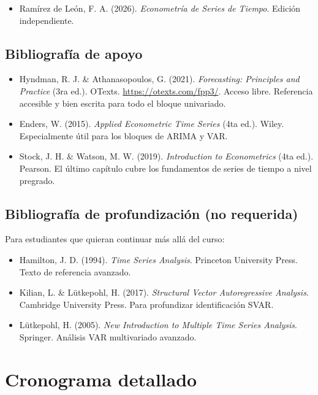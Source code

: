 \documentclass[11pt,letterpaper]{article}
\begin{document}
\begin{itemize}[leftmargin=*, itemsep=0.15em]
  \item Ramírez de León, F. A. (2026). \emph{Econometría de Series de Tiempo}. Edición independiente. 
\end{itemize}

\subsection{Bibliografía de apoyo}

\begin{itemize}[leftmargin=*, itemsep=0.15em]
  \item Hyndman, R. J. \& Athanasopoulos, G. (2021). \emph{Forecasting: Principles and Practice} (3ra ed.). OTexts. \url{https://otexts.com/fpp3/}. Acceso libre. Referencia accesible y bien escrita para todo el bloque univariado.
  \item Enders, W. (2015). \emph{Applied Econometric Time Series} (4ta ed.). Wiley. Especialmente útil para los bloques de ARIMA y VAR.
  \item Stock, J. H. \& Watson, M. W. (2019). \emph{Introduction to Econometrics} (4ta ed.). Pearson. El último capítulo cubre los fundamentos de series de tiempo a nivel pregrado.
\end{itemize}

\subsection{Bibliografía de profundización (no requerida)}

Para estudiantes que quieran continuar más allá del curso:

\begin{itemize}[leftmargin=*, itemsep=0.15em]
  \item Hamilton, J. D. (1994). \emph{Time Series Analysis}. Princeton University Press. Texto de referencia avanzado.
  \item Kilian, L. \& Lütkepohl, H. (2017). \emph{Structural Vector Autoregressive Analysis}. Cambridge University Press. Para profundizar identificación SVAR.
  \item Lütkepohl, H. (2005). \emph{New Introduction to Multiple Time Series Analysis}. Springer. Análisis VAR multivariado avanzado.
\end{itemize}

\section{Cronograma detallado}
\end{document}
